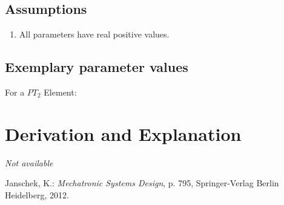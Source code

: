 \documentclass[10pt,a4paper]{article}
\begin{document}
	\subsection{Assumptions} %
	\begin{enumerate} %
		\item All parameters have real positive values.
	\end{enumerate}
	
	
	\subsection{Exemplary parameter values}
	For a $PT_2$ Element:\\
	

	
	\section{Derivation and Explanation} %
	
	\textit{Not available}
	
	
	\begin{thebibliography}{10}		
		Janschek, K.: 
		\textit{Mechatronic Systems Design}, p. 795, Springer-Verlag Berlin Heidelberg, 2012.
	\end{thebibliography}
\end{document}
